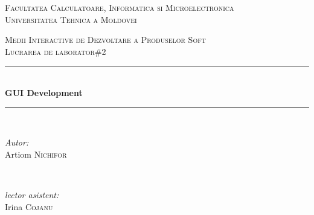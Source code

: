 \begin{titlepage}


  \begin{center}

  \textsc{\large Facultatea Calculatoare, Informatica si Microelectronica}\\[0.5cm]
  \textsc{\large Universitatea Tehnica a Moldovei}\\[1.2cm] 
  \vspace{25 mm}

  \textsc{\Large Medii Interactive de Dezvoltare a Produselor Soft}\\[0.5cm]
  \textsc{\large Lucrarea de laborator\#2}\\[0.5cm]

\newcommand{\HRule}{\rule{\linewidth}{0.5mm}} 


  \vspace{10 mm}
  \HRule \\[0.4cm]
  { \LARGE \bfseries GUI Development  }\\[0.4cm] 
  \HRule \\[1.5cm]

      \vspace{30mm}

      \begin{minipage}{0.4\textwidth}
      \begin{flushleft} \large
      \emph{Autor:}\\
      Artiom \textsc{Nichifor}
      \end{flushleft}
      \end{minipage}
      ~
      \begin{minipage}{0.4\textwidth}
      \begin{flushright} \large
      \emph{lector asistent:} \\
      Irina \textsc{Cojanu} \\
   
      \end{flushright}
      \end{minipage}\\[4cm]

      \vspace{5 mm}

      \vfill 
      \end{center}
      
\end{titlepage}


